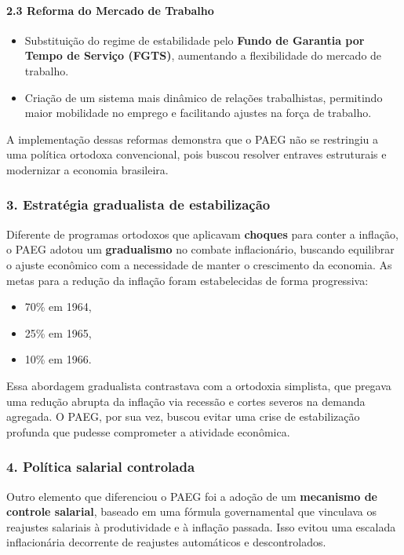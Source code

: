 \documentclass[a4paper,12pt]{article}[abntex2]
\begin{document}
\paragraph{2.3 Reforma do Mercado de Trabalho}
\begin{itemize}
    \item Substituição do regime de estabilidade pelo \textbf{Fundo de Garantia por Tempo de Serviço (FGTS)}, aumentando a flexibilidade do mercado de trabalho.
    \item Criação de um sistema mais dinâmico de relações trabalhistas, permitindo maior mobilidade no emprego e facilitando ajustes na força de trabalho.
\end{itemize}

A implementação dessas reformas demonstra que o PAEG não se restringiu a uma política ortodoxa convencional, pois buscou resolver entraves estruturais e modernizar a economia brasileira.

\subsubsection{3. Estratégia gradualista de estabilização}
Diferente de programas ortodoxos que aplicavam \textbf{choques} para conter a inflação, o PAEG adotou um \textbf{gradualismo} no combate inflacionário, buscando equilibrar o ajuste econômico com a necessidade de manter o crescimento da economia. As metas para a redução da inflação foram estabelecidas de forma progressiva:
\begin{itemize}
    \item 70\% em 1964,
    \item 25\% em 1965,
    \item 10\% em 1966.
\end{itemize}

Essa abordagem gradualista contrastava com a ortodoxia simplista, que pregava uma redução abrupta da inflação via recessão e cortes severos na demanda agregada. O PAEG, por sua vez, buscou evitar uma crise de estabilização profunda que pudesse comprometer a atividade econômica.

\subsubsection{4. Política salarial controlada}
Outro elemento que diferenciou o PAEG foi a adoção de um \textbf{mecanismo de controle salarial}, baseado em uma fórmula governamental que vinculava os reajustes salariais à produtividade e à inflação passada. Isso evitou uma escalada inflacionária decorrente de reajustes automáticos e descontrolados.
\end{document}
